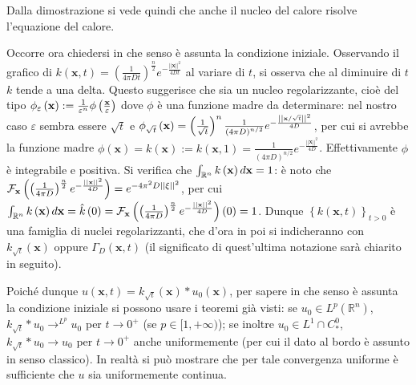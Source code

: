\documentclass{article}
\begin{document}
Dalla dimostrazione si vede quindi che anche il nucleo del calore risolve
l'equazione del calore.

Occorre ora chiedersi in che senso \`{e} assunta la condizione iniziale.
Osservando il grafico di $k\left( \mathbf{x},t\right) =\left( \frac{1}{4\pi
Dt}\right) ^{\frac{n}{2}}e^{-\frac{\left\vert \left\vert \mathbf{x}%
\right\vert \right\vert ^{2}}{4Dt}}$ al variare di $t$, si osserva che al
diminuire di $t$ $k$ tende a una delta. Questo suggerisce che sia un nucleo
regolarizzante, cio\`{e} del tipo $\phi _{\varepsilon }\left( \mathbf{x}%
\right) :=\frac{1}{\varepsilon ^{n}}\phi \left( \frac{\mathbf{x}}{%
\varepsilon }\right) $ dove $\phi $ \`{e} una funzione madre da determinare:
nel nostro caso $\varepsilon $ sembra essere $\sqrt{t}$ e $\phi _{\sqrt{t}%
}\left( \mathbf{x}\right) =\left( \frac{1}{\sqrt{t}}\right) ^{n}\frac{1}{%
\left( 4\pi D\right) ^{n/2}}e^{-\frac{\left\vert \left\vert \mathbf{x/}\sqrt{%
t}\right\vert \right\vert ^{2}}{4D}}$, per cui si avrebbe la funzione madre $%
\phi \left( \mathbf{x}\right) =k\left( \mathbf{x}\right) :=k\left( \mathbf{x}%
,1\right) =\frac{1}{\left( 4\pi D\right) ^{n/2}}e^{-\frac{\left\vert
\left\vert \mathbf{x}\right\vert \right\vert ^{2}}{4D}}$. Effettivamente $%
\phi $ \`{e} integrabile e positiva. Si verifica che $\int_{%
\mathbb{R}
^{n}}k\left( \mathbf{x}\right) d\mathbf{x}=1$: \`{e} noto che $\mathcal{F}_{%
\mathbf{x}}\left( \left( \frac{1}{4\pi D}\right) ^{\frac{n}{2}}e^{-\frac{%
\left\vert \left\vert \mathbf{x}\right\vert \right\vert ^{2}}{4D}}\right)
=e^{-4\pi ^{2}D\left\vert \left\vert \mathbf{\xi }\right\vert \right\vert
^{2}}$, per cui $\int_{%
\mathbb{R}
^{n}}k\left( \mathbf{x}\right) d\mathbf{x}=\hat{k}\left( 0\right) =\mathcal{F%
}_{\mathbf{x}}\left( \left( \frac{1}{4\pi D}\right) ^{\frac{n}{2}}e^{-\frac{%
\left\vert \left\vert \mathbf{x}\right\vert \right\vert ^{2}}{4D}}\right)
\left( 0\right) =1$. Dunque $\left\{ k\left( \mathbf{x},t\right) \right\}
_{t>0}$ \`{e} una famiglia di nuclei regolarizzanti, che d'ora in poi si
indicheranno con $k_{\sqrt{t}}\left( \mathbf{x}\right) $ oppure $\Gamma
_{D}\left( \mathbf{x},t\right) $ (il significato di quest'ultima notazione
sar\`{a} chiarito in seguito).

Poich\'{e} dunque $u\left( \mathbf{x},t\right) =k_{\sqrt{t}}\left( \mathbf{x}%
\right) \ast u_{0}\left( \mathbf{x}\right) $, per sapere in che senso \`{e}
assunta la condizione iniziale si possono usare i teoremi gi\`{a} visti: se $%
u_{0}\in L^{p}\left( 
\mathbb{R}
^{n}\right) $, $k_{\sqrt{t}}\ast u_{0}\rightarrow ^{L^{p}}u_{0}$ per $%
t\rightarrow 0^{+}$ (se $p\in \lbrack 1,+\infty )$); se inoltre $u_{0}\in
L^{1}\cap C_{\ast }^{0}$, $k_{\sqrt{t}}\ast u_{0}\rightarrow u_{0}$ per $%
t\rightarrow 0^{+}$ anche uniformemente (per cui il dato al bordo \`{e}
assunto in senso classico). In realt\`{a} si pu\`{o} mostrare che per tale
convergenza uniforme \`{e} sufficiente che $u$ sia uniformemente continua.
\end{document}
